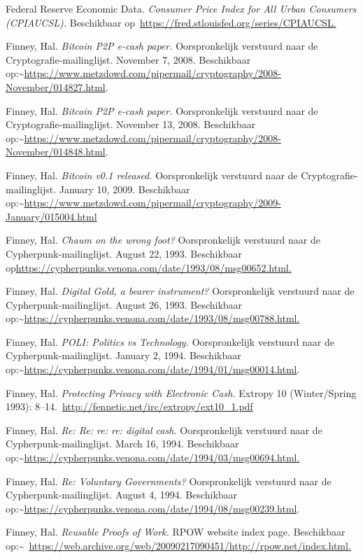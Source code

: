 \documentclass[smalldemyvopaper,11pt,twoside,onecolumn,openright,extrafontsizes,hidelinks]{memoir}
\begin{document}
Federal Reserve Economic Data. \emph{Consumer Price Index for All Urban
Consumers (CPIAUCSL).} Beschikbaar
op~\href{https://fred.stlouisfed.org/series/CPIAUCSL}{https://fred.stlouisfed.org/series/CPIAUCSL.}

Finney, Hal. \emph{Bitcoin P2P e-cash paper.} Oorspronkelijk verstuurd
naar de Cryptografie-mailinglijst. November 7, 2008. Beschikbaar
op:\textasciitilde{}\url{https://www.metzdowd.com/pipermail/cryptography/2008-November/014827.html}.

Finney, Hal. \emph{Bitcoin P2P e-cash paper.} Oorspronkelijk verstuurd
naar de Cryptografie-mailinglijst. November 13, 2008. Beschikbaar
op:\textasciitilde{}\url{https://www.metzdowd.com/pipermail/cryptography/2008-November/014848.html}.

Finney, Hal. \emph{Bitcoin v0.1 released.} Oorspronkelijk verstuurd naar
de Cryptografie-mailinglijst. January 10, 2009. Beschikbaar
op:\textasciitilde{}\url{https://www.metzdowd.com/pipermail/cryptography/2009-January/015004.html}

Finney, Hal. \emph{Chaum on the wrong foot?} Oorspronkelijk verstuurd
naar de Cypherpunk-mailinglijst. August 22, 1993. Beschikbaar
op\url{https://cypherpunks.venona.com/date/1993/08/msg00652.html.}

Finney, Hal. \emph{Digital Gold, a bearer instrument?} Oorspronkelijk
verstuurd naar de Cypherpunk-mailinglijst. August 26, 1993. Beschikbaar
op:\textasciitilde{}\url{https://cypherpunks.venona.com/date/1993/08/msg00788.html.}

Finney, Hal. \emph{POLI: Politics vs Technology.} Oorspronkelijk
verstuurd naar de Cypherpunk-mailinglijst. January 2, 1994. Beschikbaar
op:\textasciitilde{}\url{https://cypherpunks.venona.com/date/1994/01/msg00014.html}.

Finney, Hal. \emph{Protecting Privacy with Electronic Cash.} Extropy 10
(Winter/Spring 1993):
8--14.~\url{http://fennetic.net/irc/extropy/ext10_1.pdf}

Finney, Hal. \emph{Re: Re: re: re: digital cash.} Oorspronkelijk
verstuurd naar de Cypherpunk-mailinglijst. March 16, 1994. Beschikbaar
op:\textasciitilde{}\url{https://cypherpunks.venona.com/date/1994/03/msg00694.html.}

Finney, Hal. \emph{Re: Voluntary Governments?} Oorspronkelijk verstuurd
naar de Cypherpunk-mailinglijst. August 4, 1994. Beschikbaar
op:\textasciitilde{}\url{https://cypherpunks.venona.com/date/1994/08/msg00239.html}.

Finney, Hal. \emph{Reusable Proofs of Work.} RPOW website index page.
Beschikbaar
op:\textasciitilde~\href{https://web.archive.org/web/20090217090451/http:/rpow.net/index.html.}{https://web.archive.org/web/20090217090451/http://rpow.net/index.html.}
\end{document}
